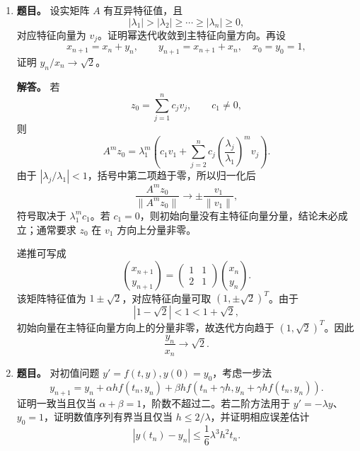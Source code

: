 ﻿\documentclass[UTF8,12pt]{ctexart}
\begin{document}
\begin{enumerate}[label=\textbf{\arabic*.},leftmargin=2.2em]
令 \(Q_n=P_n/\|P_n\|\)，则存在
\[
\alpha_n=\langle xQ_n,Q_n\rangle,
\qquad
\beta_n=\langle xQ_n,Q_{n-1}\rangle>0,
\]
使得
\[
xQ_n=\beta_{n+1}Q_{n+1}+\alpha_nQ_n+\beta_nQ_{n-1}.
\]
所以
\[
Q_{n+1}=\frac{x-
\alpha_n}{\beta_{n+1}}Q_n-
\frac{\beta_n}{\beta_{n+1}}Q_{n-1}.
\]
在基 \(Q_0,Q_1,Q_2,Q_3\) 下，乘法算子 \(f\mapsto xf\) 的截断矩阵为
\[
J_4=\begin{pmatrix}
\alpha_0&\beta_1&0&0\\
\beta_1&\alpha_1&\beta_2&0\\
0&\beta_2&\alpha_2&\beta_3\\
0&0&\beta_3&\alpha_3
\end{pmatrix}.
\]
递推关系说明
\[
\det(\lambda I-J_4)=cQ_4(\lambda),\qquad c\ne0.
\]
因此 \(\lambda\) 是四点 Gauss 节点当且仅当它是该实对称三对角 Jacobi 矩阵的特征值。

\item \textbf{题目。} 设实矩阵 \(A\) 有互异特征值，且
\[
|\lambda_1|>|\lambda_2|\ge\cdots\ge |\lambda_n|\ge0,
\]
对应特征向量为 \(v_j\)。证明幂迭代收敛到主特征向量方向。再设
\[
x_{n+1}=x_n+y_n,
\qquad
 y_{n+1}=x_{n+1}+x_n,
\quad x_0=y_0=1,
\]
证明 \(y_n/x_n\to\sqrt2\)。

\textbf{解答。} 若
\[
z_0=\sum_{j=1}^n c_jv_j,
\qquad c_1\ne0,
\]
则
\[
A^mz_0=\lambda_1^m\left(c_1v_1+
\sum_{j=2}^n c_j\left(\frac{\lambda_j}{\lambda_1}\right)^mv_j\right).
\]
由于 \(|\lambda_j/\lambda_1|<1\)，括号中第二项趋于零，所以归一化后
\[
\frac{A^mz_0}{\|A^mz_0\|}\to \pm\frac{v_1}{\|v_1\|},
\]
符号取决于 \(\lambda_1^mc_1\)。若 \(c_1=0\)，则初始向量没有主特征向量分量，结论未必成立；通常要求 \(z_0\) 在 \(v_1\) 方向上分量非零。

递推可写成
\[
\binom{x_{n+1}}{y_{n+1}}=
\begin{pmatrix}1&1\\2&1\end{pmatrix}\binom{x_n}{y_n}.
\]
该矩阵特征值为 \(1\pm\sqrt2\)，对应特征向量可取 \((1,\pm\sqrt2)^T\)。由于
\[
|1-
\sqrt2|<1<1+
\sqrt2,
\]
初始向量在主特征向量方向上的分量非零，故迭代方向趋于 \((1,\sqrt2)^T\)。因此
\[
\frac{y_n}{x_n}\to\sqrt2.
\]

\item \textbf{题目。} 对初值问题 \(y'=f(t,y),y(0)=y_0\)，考虑一步法
\[
y_{n+1}=y_n+
\alpha h f(t_n,y_n)+\beta h f(t_n+
\gamma h,y_n+
\gamma h f(t_n,y_n)).
\]
证明一致当且仅当 \(\alpha+
\beta=1\)，阶数不超过二。若二阶方法用于 \(y'=-\lambda y\)、\(y_0=1\)，证明数值序列有界当且仅当 \(h\le2/\lambda\)，并证明相应误差估计
\[
|y(t_n)-y_n|\le \frac16\lambda^3h^2t_n.
\]


\end{enumerate}
\end{document}
